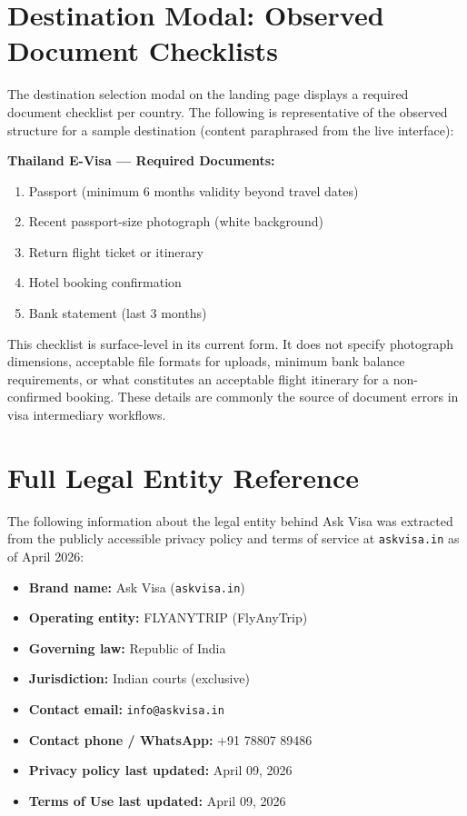 \documentclass[journal, 10pt, twoside]{IEEEtran}
\begin{document}
\section{Destination Modal: Observed Document Checklists}
\label{app:checklists}
The destination selection modal on the landing page displays a required
document checklist per country. The following is representative of the
observed structure for a sample destination (content paraphrased from
the live interface):

\textbf{Thailand E-Visa --- Required Documents:}
\begin{enumerate}
  \item Passport (minimum 6 months validity beyond travel dates)
  \item Recent passport-size photograph (white background)
  \item Return flight ticket or itinerary
  \item Hotel booking confirmation
  \item Bank statement (last 3 months)
\end{enumerate}

This checklist is surface-level in its current form. It does not specify
photograph dimensions, acceptable file formats for uploads, minimum bank
balance requirements, or what constitutes an acceptable flight itinerary
for a non-confirmed booking. These details are commonly the source of
document errors in visa intermediary workflows.

\section{Full Legal Entity Reference}
\label{app:legal}
The following information about the legal entity behind Ask Visa was
extracted from the publicly accessible privacy policy and terms of service
at \texttt{askvisa.in} as of April 2026:

\begin{itemize}
  \item \textbf{Brand name:} Ask Visa (\texttt{askvisa.in})
  \item \textbf{Operating entity:} FLYANYTRIP (FlyAnyTrip)
  \item \textbf{Governing law:} Republic of India
  \item \textbf{Jurisdiction:} Indian courts (exclusive)
  \item \textbf{Contact email:} \texttt{info@askvisa.in}
  \item \textbf{Contact phone / WhatsApp:} +91 78807 89486
  \item \textbf{Privacy policy last updated:} April 09, 2026
  \item \textbf{Terms of Use last updated:} April 09, 2026
\end{itemize}
\end{document}
